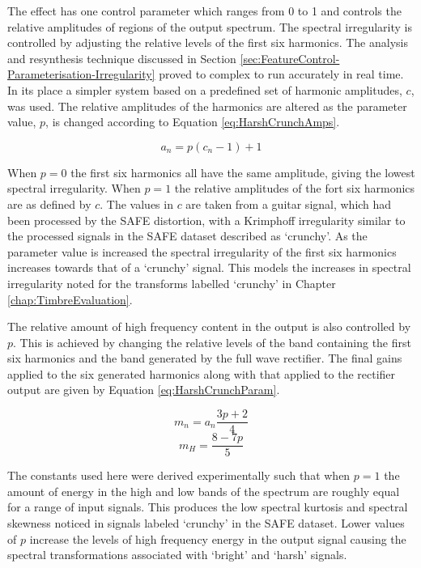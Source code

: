 			The effect has one control parameter which ranges from 0 to 1 and controls the relative amplitudes
			of regions of the output spectrum. The spectral irregularity is controlled by adjusting the
			relative levels of the first six harmonics. The analysis and resynthesis technique discussed in
			Section \ref{sec:FeatureControl-Parameterisation-Irregularity} proved to complex to run accurately
			in real time. In its place a simpler system based on a predefined set of harmonic amplitudes,
			$c$, was used. The relative amplitudes of the harmonics are altered as the parameter value, $p$,
			is changed according to Equation \ref{eq:HarshCrunchAmps}.

			\begin{equation}
				a_{n} = p(c_{n} - 1) + 1
				\label{eq:HarshCrunchAmps}
			\end{equation}

			When $p = 0$ the first six harmonics all have the same amplitude, giving the lowest spectral
			irregularity. When $p = 1$ the relative amplitudes of the fort six harmonics are as defined by $c$.
			The values in $c$ are taken from a guitar signal, which had been processed by the SAFE distortion,
			with a Krimphoff irregularity similar to the processed signals in the SAFE dataset described as
			`crunchy'. As the parameter value is increased the spectral irregularity of the first six harmonics
			increases towards that of a `crunchy' signal. This models the increases in spectral irregularity
			noted for the transforms labelled `crunchy' in Chapter \ref{chap:TimbreEvaluation}.
			
			The relative amount of high frequency content in the output is also controlled by $p$. This is
			achieved by changing the relative levels of the band containing the first six harmonics and the band
			generated by the full wave rectifier. The final gains applied to the six generated harmonics along
			with that applied to the rectifier output are given by Equation \ref{eq:HarshCrunchParam}.

			\[ m_{n} = a_{n}\frac{3p + 2}{4} \]
			\begin{equation}
				m_{H} = \frac{8 - 7p}{5}
				\label{eq:HarshCrunchParam}
			\end{equation}

			The constants used here were derived experimentally such that when $p = 1$ the amount of energy in
			the high and low bands of the spectrum are roughly equal for a range of input signals. This produces
			the low spectral kurtosis and spectral skewness noticed in signals labeled `crunchy' in the SAFE
			dataset. Lower values of $p$ increase the levels of high frequency energy in the output signal
			causing the spectral transformations associated with `bright' and `harsh' signals.

